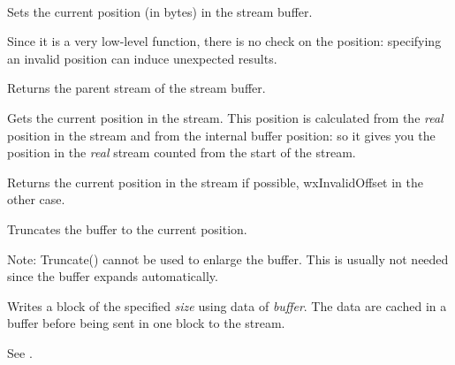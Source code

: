 
\\


\label{wxstreambuffersetintposition}


Sets the current position (in bytes) in the stream buffer.


Since it is a very low-level function, there is no check on the position:
specifying an invalid position can induce unexpected results.


\label{wxstreambufferstream}


Returns the parent stream of the stream buffer.


\label{wxstreambuffertell}


Gets the current position in the stream. This position is calculated from
the {\it real} position in the stream and from the internal buffer position: so
it gives you the position in the {\it real} stream counted from the start of
the stream.


Returns the current position in the stream if possible, wxInvalidOffset in the
other case.


\label{wxstreambuffertruncate}


Truncates the buffer to the current position.

Note: Truncate() cannot be used to enlarge the buffer. This is
usually not needed since the buffer expands automatically.


\label{wxstreambufferwrite}


Writes a block of the specified {\it size} using data of {\it buffer}. The data
are cached in a buffer before being sent in one block to the stream.


See .


